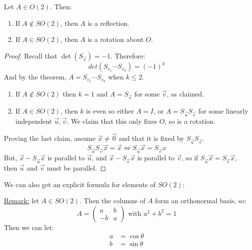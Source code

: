 \documentclass[../Main.tex]{subfiles}
\begin{document}
\begin{lemma}[Elements of $O(2)$]
    Let $A \in O(2)$. Then:
    \begin{enumerate}
        \item If $A \notin SO(2)$, then $A$ is a reflection.
        \item If $A \in SO(2)$, then $A$ is a rotation about $O$.
    \end{enumerate}
\end{lemma}
\begin{proof}
    Recall that $\det{(S_{\vec{v}})} = -1$. Therefore:
    \begin{equation*}
        det{(S_{v_1} \cdots S_{v_k})} = (-1)^k
    \end{equation*}
    And by the theorem, $A = S_{v_1} \cdots S_{v_k}$ when $k \leq 2$.
    \begin{enumerate}
        \item If $A \notin SO(2)$ then $k = 1$ and $A = S_{\vec{v}}$ for some $\vec{v}$, as claimed.
        \item If $A \in SO(2)$, then $k$ is even so either $A = I$, or $A = S_{\vec{u}} S_{\vec{v}}$ for some linearly independent $\vec{u}, \vec{v}$. We claim that this only fixes $O$, so is a rotation.
    \end{enumerate}
    Proving the last claim, assume $\vec{x} \neq \vec{0}$ and that it is fixed by $S_{\vec{u}} S_{\vec{v}}$.
    \begin{equation*}
        S_{\vec{u}} S_{\vec{v}} \vec{x} = \vec{x} \Leftrightarrow S_{\vec{u}} \vec{x} = S_{\vec{v}} x
    \end{equation*}
    But, $\vec{x} - S_{\vec{u}} \vec{x}$ is parallel to $\vec{u}$, and $\vec{x} - S_{\vec{v}} \vec{x}$ is parallel to $\vec{v}$, so if $S_{\vec{u}} \vec{x} = S_{\vec{v}} \vec{x}$, then $\vec{u}$ and $\vec{v}$ must be parallel. \contradiction
\end{proof}
We can also get an explicit formula for elements of $SO(2)$:\par
\underline{Remark:} let $A \in SO(2)$. Then the columns of $A$ form an orthonormal basis, so:
\begin{equation*}
    A =
    \begin{pmatrix}
        a & b \\
        -b & a
    \end{pmatrix}
    \text{ with } a^2 + b^2 = 1
\end{equation*}
Then we can let:
\begin{align*}
    a &= \cos{\theta} \\
    b &= \sin{\theta}
\end{align*}
\end{document}
